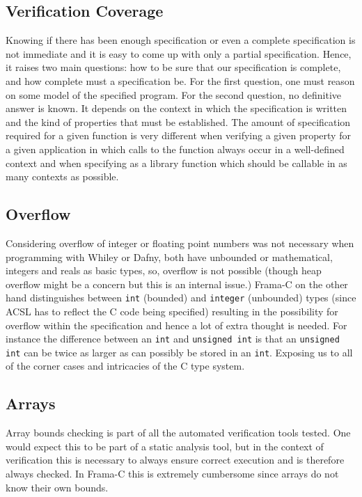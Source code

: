 \documentclass[10pt]{article} %
\begin{document}
\subsection{Verification Coverage}
Knowing if there has been enough specification or even a complete specification is not immediate and it is easy to come up with only a partial specification. Hence, it raises two main questions: how to be sure that our specification is complete, and how complete must a specification be. For the first question, one must reason on some model of the specified program. For the second question, no definitive answer is known. It depends on the context in which the specification is written and the kind of properties that must be established. The amount of specification required for a given function is very different when verifying a given property for a given application in which calls to the function always occur in a well-defined context and when specifying as a library function which should be callable in as many contexts as possible.
\subsection{Overflow}
Considering overflow of integer or floating point numbers was not necessary when programming with Whiley or Dafny, both have unbounded or mathematical, integers and reals as basic types, so, overflow is not possible (though heap overflow might be a concern but this is an internal issue.) Frama-C on the other hand distinguishes between \verb/int/ (bounded) and \verb/integer/ (unbounded) types (since ACSL has to reflect the C code being specified) resulting in the possibility for overflow within the specification and hence a lot of extra thought is needed. For instance the difference between an \verb/int/ and \verb/unsigned int/ is that an \verb/unsigned int/ can be twice as larger as can possibly be stored in an \verb/int/. Exposing us to all of the corner cases and intricacies of the C type system.
\subsection{Arrays}
Array bounds checking is part of all the automated verification tools tested. One would expect this to be part of a static analysis tool, but in the context of verification this is necessary to always ensure correct execution and is therefore always checked. In Frama-C this is extremely cumbersome since arrays do not know their own bounds.
\end{document}
